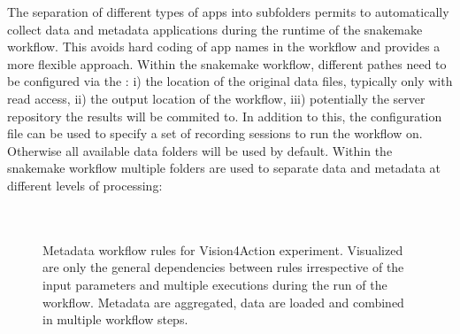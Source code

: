 The separation of different types of apps into subfolders permits to automatically collect data and metadata applications during the runtime of the snakemake workflow. This avoids hard coding of app names in the workflow and provides a more flexible approach.
Within the snakemake workflow, different pathes need to be configured via the : i) the location of the original data files, typically only with read access, ii) the output location of the workflow, iii) potentially the server repository the results will be commited to. In addition to this, the configuration file can be used to specify a set of recording sessions to run the workflow on. Otherwise all available data folders will be used by default.
Within the snakemake workflow multiple folders are used to separate data and metadata at different levels of processing:\\

\begin{minipage}[t]{\textwidth}
\ \\
\end{minipage}



\paragraph{}

\begin{figure}
    \centering
    
    \caption[Metadata workflow rules for Vision-for-Action experiment]{Metadata workflow rules for Vision4Action experiment. Visualized are only the general dependencies between rules irrespective of the input parameters and multiple executions during the run of the workflow. Metadata are aggregated, data are loaded and combined in multiple workflow steps.}
    \label{fig:v4a_metadata_workflow_rulegraph}
\end{figure}

